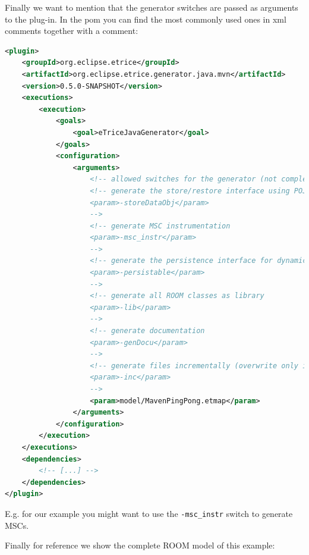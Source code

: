 Finally we want to mention that the generator switches are passed as arguments to the plug-in.
In the pom you can find the most commonly used ones in xml comments together with a comment:

\begin{lstlisting}[language=XML]
<plugin>
	<groupId>org.eclipse.etrice</groupId>
	<artifactId>org.eclipse.etrice.generator.java.mvn</artifactId>
	<version>0.5.0-SNAPSHOT</version>
	<executions>
		<execution>
			<goals>
				<goal>eTriceJavaGenerator</goal>
			</goals>
			<configuration>
				<arguments>
					<!-- allowed switches for the generator (not complete) -->
					<!-- generate the store/restore interface using POJO data objects
					<param>-storeDataObj</param>
					-->
					<!-- generate MSC instrumentation
					<param>-msc_instr</param>
					-->
					<!-- generate the persistence interface for dynamic actors
					<param>-persistable</param>
					-->
					<!-- generate all ROOM classes as library
					<param>-lib</param>
					-->
					<!-- generate documentation
					<param>-genDocu</param>
					-->
					<!-- generate files incrementally (overwrite only if contents changed)
					<param>-inc</param>
					-->
					<param>model/MavenPingPong.etmap</param>
				</arguments>
			</configuration>
		</execution>
	</executions>
	<dependencies>
		<!-- [...] -->
	</dependencies>
</plugin>
\end{lstlisting}

E.g. for our example you might want to use the \texttt{-msc\_instr} switch to generate MSCs.

Finally for reference we show the complete ROOM model of this example:


